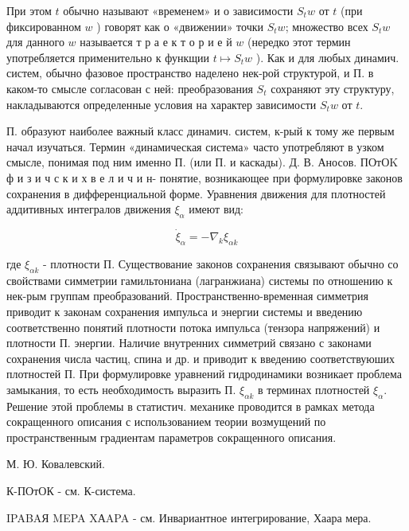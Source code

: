 \documentclass[10pt]{article}
\begin{document}
При этом $t$ обычно называют «временем» и о зависимости $S_{t} w$ от $t$ (при фиксированном $w$ ) говорят как о «движении» точки $S_{t} w$; множество всех $S_{t} w$ для данного $w$ называется т р а е к т о р и е й $w$ (нередко этот термин употребляется применительно к функщии $t \mapsto S_{t} w$ ). Как и для любых динамич. систем, обычно фазовое пространство наделено нек-рой структурой, и П. в каком-то смысле согласован с ней: преобразования $S_{t}$ сохраняют эту структуру, накладываются определенные условия на характер зависимости $S_{t} w$ от $t$.



П. образуют наиболее важный класс динамич. систем, к-рый к тому же первым начал изучаться. Термин «динамическая система» часто употребляют в узком смысле, понимая под ним именно П. (или П. и каскады). Д. В. Аносов. ПОтОK ф и з и ч с к и х в е л и ч и н- понятие, возникающее при формулировке законов сохранения в дифференциальной форме. Уравнения движения для плотностей аддитивных интегралов движения $\xi_{\alpha}$ имеют вид:



\[

\dot{\xi}_{\alpha}=-\nabla_{k} \xi_{\alpha k}

\]



где $\xi_{\alpha k}$ - плотности П. Существование законов сохранения связывают обычно со свойствами симметрии гамильтониана (лагранжиана) системы по отношению к нек-рым группам преобразований. Пространственно-временная симметрия приводит к законам сохранения импульса и энергии системы и введению соответственно понятий плотности потока импульса (тензора напряжений) и плотности П. энергии. Наличие внутренних симметрий связано с законами сохранения числа частиц, спина и др. и приводит к введению соответствуюших плотностей П. При формулировке уравнений гидродинамики возникает проблема замыкания, то есть необходимость выразить П. $\xi_{\alpha k}$ в терминах плотностей $\xi_{\alpha}$. Решение этой проблемы в статистич. механике проводится в рамках метода сокращенного описания с использованием теории возмущений по пространственным градиентам параметров сокращенного описания.



М. Ю. Ковалевский.



К-ПОтОК - см. К-система.



IPABAЯ MEPA XАAPA - см. Инвариантное интегрирование, Хаара мера.
\end{document}
